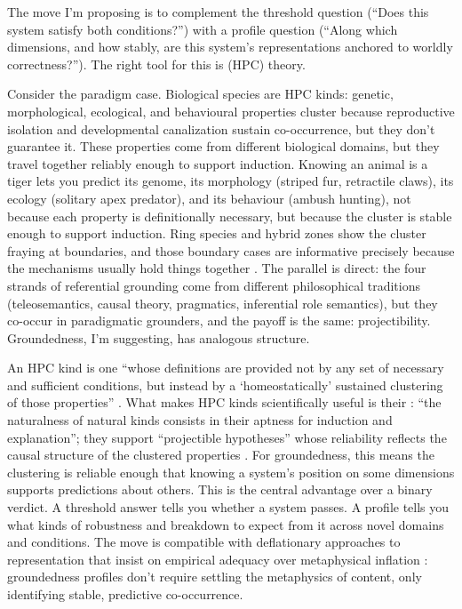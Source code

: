 \documentclass[12pt]{article}
\begin{document}
The move I'm proposing is to complement the threshold question (\enquote{Does this system satisfy both conditions?}) with a profile question (\enquote{Along which dimensions, and how stably, are this system's representations anchored to worldly correctness?}). The right tool for this is  (HPC) theory.

Consider the paradigm case. Biological species are HPC kinds: genetic, morphological, ecological, and behavioural properties cluster because reproductive isolation and developmental canalization sustain co-occurrence, but they don't guarantee it. These properties come from different biological domains, but they travel together reliably enough to support induction. Knowing an animal is a tiger lets you predict its genome, its morphology (striped fur, retractile claws), its ecology (solitary apex predator), and its behaviour (ambush hunting), not because each property is definitionally necessary, but because the cluster is stable enough to support induction. Ring species and hybrid zones show the cluster fraying at boundaries, and those boundary cases are informative precisely because the mechanisms usually hold things together \citep{boyd_1999_homeostasis}. The parallel is direct: the four strands of referential grounding come from different philosophical traditions (teleosemantics, causal theory, pragmatics, inferential role semantics), but they co-occur in paradigmatic grounders, and the payoff is the same: projectibility. Groundedness, I'm suggesting, has analogous structure.

An HPC kind is one \enquote{whose definitions are provided not by any set of necessary and sufficient conditions, but instead by a \enquote*{homeostatically} sustained clustering of those properties} \citep[141]{boyd_1999_homeostasis}. What makes HPC kinds scientifically useful is their : \enquote{the naturalness of natural kinds consists in their aptness for induction and explanation}; they support \enquote{projectible hypotheses} whose reliability reflects the causal structure of the clustered properties \citep[147]{boyd_1999_homeostasis}. For groundedness, this means the clustering is reliable enough that knowing a system's position on some dimensions supports predictions about others. This is the central advantage over a binary verdict. A threshold answer tells you whether a system passes. A profile tells you what kinds of robustness and breakdown to expect from it across novel domains and conditions. The move is compatible with deflationary approaches to representation that insist on empirical adequacy over metaphysical inflation \citep{coelho_mollo_2022_deflationary_realism}: groundedness profiles don't require settling the metaphysics of content, only identifying stable, predictive co-occurrence.
\end{document}
